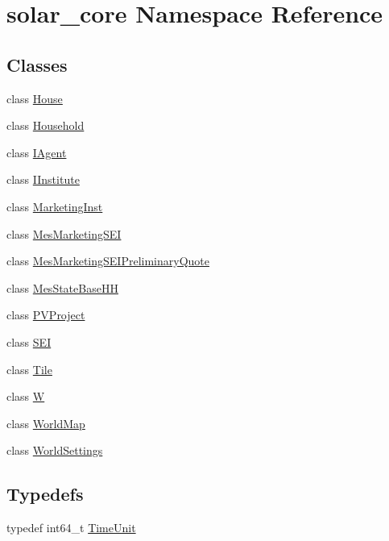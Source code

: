 \hypertarget{namespacesolar__core}{}\section{solar\+\_\+core Namespace Reference}
\label{namespacesolar__core}
\subsection*{Classes}
\begin{DoxyCompactItemize}
\item 
class \hyperlink{classsolar__core_1_1_house}{House}
\item 
class \hyperlink{classsolar__core_1_1_household}{Household}
\item 
class \hyperlink{classsolar__core_1_1_i_agent}{I\+Agent}
\item 
class \hyperlink{classsolar__core_1_1_i_institute}{I\+Institute}
\item 
class \hyperlink{classsolar__core_1_1_marketing_inst}{Marketing\+Inst}
\item 
class \hyperlink{classsolar__core_1_1_mes_marketing_s_e_i}{Mes\+Marketing\+S\+E\+I}
\item 
class \hyperlink{classsolar__core_1_1_mes_marketing_s_e_i_preliminary_quote}{Mes\+Marketing\+S\+E\+I\+Preliminary\+Quote}
\item 
class \hyperlink{classsolar__core_1_1_mes_state_base_h_h}{Mes\+State\+Base\+H\+H}
\item 
class \hyperlink{classsolar__core_1_1_p_v_project}{P\+V\+Project}
\item 
class \hyperlink{classsolar__core_1_1_s_e_i}{S\+E\+I}
\item 
class \hyperlink{classsolar__core_1_1_tile}{Tile}
\item 
class \hyperlink{classsolar__core_1_1_w}{W}
\item 
class \hyperlink{classsolar__core_1_1_world_map}{World\+Map}
\item 
class \hyperlink{classsolar__core_1_1_world_settings}{World\+Settings}
\end{DoxyCompactItemize}
\subsection*{Typedefs}
\begin{DoxyCompactItemize}
\item 
typedef int64\+\_\+t \hyperlink{namespacesolar__core_a4b5949d07259da6f8a20d12a30403e90}{Time\+Unit}
\end{DoxyCompactItemize}
